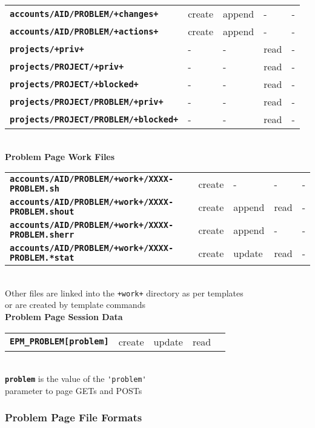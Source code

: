 \documentclass[12pt]{article}
\newcommand{\TT}[1]{{\tt \bfseries #1}}
\begin{document}
\begin{center}
\begin{tabular}{lllll}
\TT{accounts/AID/PROBLEM/+changes+}	& create  & append & - & - \\
\TT{accounts/AID/PROBLEM/+actions+}	& create  & append & - & - \\
\TT{projects/+priv+}			& -  & - & read & - \\
\TT{projects/PROJECT/+priv+}		& -  & - & read & - \\
\TT{projects/PROJECT/+blocked+}		& -  & - & read & - \\
\TT{projects/PROJECT/PROBLEM/+priv+}	& -  & - & read & - \\
\TT{projects/PROJECT/PROBLEM/+blocked+}	& -  & - & read & - \\
\end{tabular}
\\\bigskip
{\bf Problem Page Work Files}
\\[1ex]
\begin{tabular}{lllll}
\TT{accounts/AID/PROBLEM/+work+/XXXX-PROBLEM.sh}     & create  & - & - & - \\
\TT{accounts/AID/PROBLEM/+work+/XXXX-PROBLEM.shout}  & create  & append & read
                                                                        & - \\
\TT{accounts/AID/PROBLEM/+work+/XXXX-PROBLEM.sherr}  & create  & append & -
                                                                        & - \\
\TT{accounts/AID/PROBLEM/+work+/XXXX-PROBLEM.*stat}  & create  & update & read
                                                                        & - \\
\end{tabular}
\\[2ex]
Other files are linked into the {\tt +work+} directory
as per templates \\
or are created by template commands
\\[3ex]
{\bf Problem Page Session Data}
\\[1ex]
\begin{tabular}{lllll}
\TT{EPM\_PROBLEM[problem]}
		& create  & update & read \\
\end{tabular}
\\[3ex]
\TT{problem} is the value of the \verb|'problem'| \\
parameter to page GETs and POSTs
\end{center}

\subsubsection{Problem Page File Formats}
\end{document}
